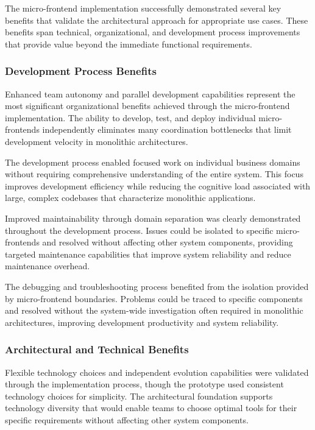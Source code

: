 \documentclass[12pt,a4paper]{report}
\begin{document}
The micro-frontend implementation successfully demonstrated several key benefits that validate the architectural approach for appropriate use cases. These benefits span technical, organizational, and development process improvements that provide value beyond the immediate functional requirements.

\subsubsection{Development Process Benefits}

Enhanced team autonomy and parallel development capabilities represent the most significant organizational benefits achieved through the micro-frontend implementation. The ability to develop, test, and deploy individual micro-frontends independently eliminates many coordination bottlenecks that limit development velocity in monolithic architectures.

The development process enabled focused work on individual business domains without requiring comprehensive understanding of the entire system. This focus improves development efficiency while reducing the cognitive load associated with large, complex codebases that characterize monolithic applications.

Improved maintainability through domain separation was clearly demonstrated throughout the development process. Issues could be isolated to specific micro-frontends and resolved without affecting other system components, providing targeted maintenance capabilities that improve system reliability and reduce maintenance overhead.

The debugging and troubleshooting process benefited from the isolation provided by micro-frontend boundaries. Problems could be traced to specific components and resolved without the system-wide investigation often required in monolithic architectures, improving development productivity and system reliability.

\subsubsection{Architectural and Technical Benefits}

Flexible technology choices and independent evolution capabilities were validated through the implementation process, though the prototype used consistent technology choices for simplicity. The architectural foundation supports technology diversity that would enable teams to choose optimal tools for their specific requirements without affecting other system components.
\end{document}
